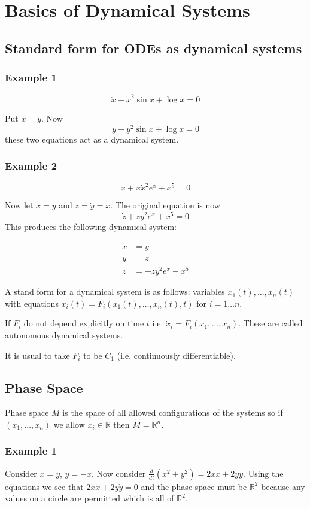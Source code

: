 \section{Basics of Dynamical Systems}

\subsection{Standard form for ODEs as dynamical systems}

\subsubsection{Example 1}

$$\ddot{x} + \dot{x}^2 \sin x + \log x = 0$$

Put $\dot{x} = y$. Now $$\dot{y} + y^2 \sin x + \log x = 0$$ these two equations act as a dynamical system.

\subsubsection{Example 2}

$$\dddot{x} + \ddot{x} \dot{x}^2 e^x + x^5 = 0$$

Now let $\dot{x} = y$ and $z = \dot{y} = \ddot{x}$. The original equation is now $$\dot{z} + z y^2 e^x + x^5 = 0$$ This produces the following dynamical system:

\begin{align*}
\dot{x} &= y \\
\dot{y} &= z \\
\dot{z} &= -z y^2 e^x - x^5
\end{align*}

\vspace{\baselineskip}

A stand form for a dynamical system is as follows: variables $x_1 (t), \ldots, x_n(t)$ with equations $\dot{x}_i (t) = F_i (x_1 (t), \ldots, x_n (t), t)$ for $i = 1 \ldots n$.

If $F_i$ do not depend explicitly on time $t$ i.e. $\dot{x}_i = F_i (x_1, \ldots, x_n)$. These are called autonomous dynamical systems.

It is usual to take $F_i$ to be $C_1$ (i.e. continuously differentiable).

\subsection{Phase Space}

Phase space $M$ is the space of all allowed configurations of the systems so if $(x_1, \ldots, x_n)$ we allow $x_i \in \mathbb{R}$ then $M = \mathbb{R}^n$.

\subsubsection{Example 1}

Consider $\dot{x} = y$, $\dot{y} = -x$. Now consider $\frac{d}{dt} (x^2 + y^2) = 2 x \dot{x} + 2 y \dot{y}$. Using the equations we see that $2 x \dot{x} + 2 y \dot{y} = 0$ and the phase space must be $\mathbb{R}^2$ because any values on a circle are permitted which is all of $\mathbb{R}^2$.